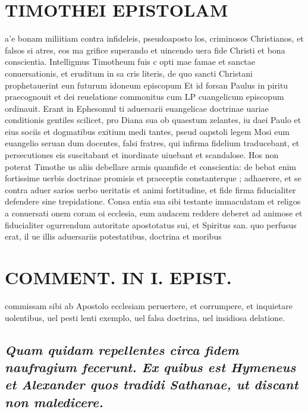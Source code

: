 \documentclass{article}
\begin{document}
\begin{pages}
\section*{TIMOTHEI EPISTOLAM }
\marginpar{[ p.39 ]}\pstart a’e bonam miliitiam contra infideleis, pseudoaposto los, criminosos Christianos, et falsos si atres, eos ma grifice superando et uincendo uera fide Christi et bona conscientia. Intelligmus Timotheum fuis c opti mae famae et sanctae conuersationis, et eruditum in sa cris literis, de quo sancti Christani prophetauerint eun futurum idoneum episcopum Et id forsan Paulus in piritu praecognouit et dei reuelatione commonitus cum LP cuangelicum episcopum ordinauit. Erant in Ephesomul ti aduersarii euangelicae doctrinae uariae conditionis gentiles scilicet, pro Diana sua ob quaestum zelantes, iu daei Paulo et eius sociis et dogmatibus exitium medi tantes, pseud oapstoli legem Mosi eum euangelio seruan dum docentes, falsi fratres, qui infirma fidelium traducebant, et persecutiones eis suscitabant et inordinate uiuebant et scandalose. Hos non poterat Timothe us aliis debellare armis quamfide et conscientia: de bebat enim fortissime uerbis doctrinae promisis et praeceptis constanterque ; adhaerere, et se contra aduer sarios uerbo ueritatis et animi fortitudine, et fide firma fiducialiter defendere sine trepidationc. Consa entia sua sibi testante immaculatam et religos a conuersati onem coram oi ecclesia, eum audacem reddere deberet ad animose et fiducialiter ogurrendum autoritate apostotatus sui, et Spiritus san. quo perfusus erat, il ue illis aduersariis potestatibus, doctrina et moribus  \pend
\section*{COMMENT. IN I. EPIST. }
\marginpar{[ p.40 ]}\pstart commissam sibi ab Apostolo ecclesiam peruertere, et corrumpere, et inquietare uolentibus, uel pesti lenti exemplo, uel falsa doctrina, uel insidiosa delatione.  \pend
{}
{}
\subsection*{\textit{Quam quidam repellentes circa fidem naufragium fecerunt. Ex quibus est Hymeneus et Alexander quos tradidi Sathanae, ut discant non maledicere. }}
{}

\end{pages}
\end{document}

